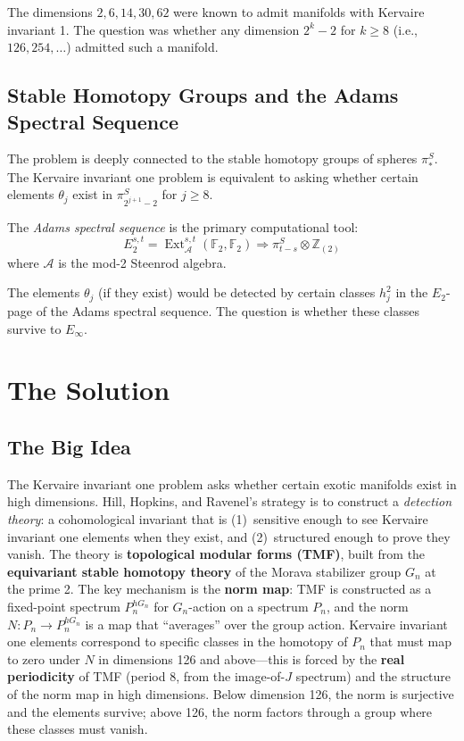 The dimensions $2, 6, 14, 30, 62$ were known to admit manifolds with Kervaire invariant 1. The question was whether any dimension $2^k - 2$ for $k \geq 8$ (i.e., $126, 254, \ldots$) admitted such a manifold.

\subsection{Stable Homotopy Groups and the Adams Spectral Sequence}

The problem is deeply connected to the stable homotopy groups of spheres $\pi_*^S$. The Kervaire invariant one problem is equivalent to asking whether certain elements $\theta_j$ exist in $\pi_{2^{j+1}-2}^S$ for $j \geq 8$.

The \emph{Adams spectral sequence} is the primary computational tool:
\begin{equation}
E_2^{s,t} = \operatorname{Ext}_{\mathcal{A}}^{s,t}(\mathbb{F}_2, \mathbb{F}_2) \Rightarrow \pi_{t-s}^S \otimes \mathbb{Z}_{(2)}
\end{equation}
where $\mathcal{A}$ is the mod-2 Steenrod algebra.

The elements $\theta_j$ (if they exist) would be detected by certain classes $h_j^2$ in the $E_2$-page of the Adams spectral sequence. The question is whether these classes survive to $E_\infty$.

\section{The Solution}

\subsection{The Big Idea}

The Kervaire invariant one problem asks whether certain exotic manifolds exist in high dimensions. Hill, Hopkins, and Ravenel's strategy is to construct a \emph{detection theory}: a cohomological invariant that is (1)~sensitive enough to see Kervaire invariant one elements when they exist, and (2)~structured enough to prove they vanish. The theory is \textbf{topological modular forms (TMF)}, built from the \textbf{equivariant stable homotopy theory} of the Morava stabilizer group $G_n$ at the prime 2. The key mechanism is the \textbf{norm map}: TMF is constructed as a fixed-point spectrum $P_n^{hG_n}$ for $G_n$-action on a spectrum $P_n$, and the norm $N: P_n \to P_n^{hG_n}$ is a map that ``averages'' over the group action. Kervaire invariant one elements correspond to specific classes in the homotopy of $P_n$ that must map to zero under $N$ in dimensions 126 and above---this is forced by the \textbf{real periodicity} of TMF (period 8, from the image-of-$J$ spectrum) and the structure of the norm map in high dimensions. Below dimension 126, the norm is surjective and the elements survive; above 126, the norm factors through a group where these classes must vanish.

